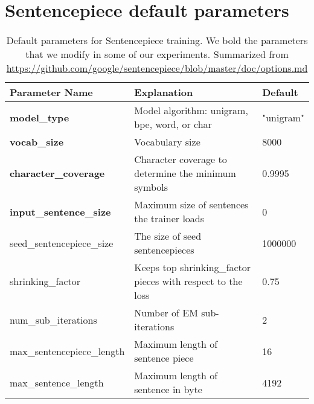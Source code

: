 \chapter{Sentencepiece default parameters}


\begin{table}[h]
    \centering
    \begin{tabular}{|p{5.3cm}|p{5cm}|p{2cm}|}
    \hline
    \textbf{Parameter Name} & \textbf{Explanation} & \textbf{Default} \\
    \hline
    \textbf{model\_type} & Model algorithm: unigram, bpe, word, or char & "unigram" \\
    \hline
    \textbf{vocab\_size} & Vocabulary size & 8000 \\
    \hline
    \textbf{character\_coverage} & Character coverage to determine the minimum symbols & 0.9995 \\
    \hline
    \textbf{input\_sentence\_size} & Maximum size of sentences the trainer loads & 0 \\
    \hline
    seed\_sentencepiece\_size & The size of seed sentencepieces & 1000000 \\
    \hline
    shrinking\_factor & Keeps top shrinking\_factor pieces with respect to the loss & 0.75 \\
    \hline
    num\_sub\_iterations & Number of EM sub-iterations & 2 \\
    \hline
    max\_sentencepiece\_length & Maximum length of sentence piece & 16 \\
    \hline
    max\_sentence\_length & Maximum length of sentence in byte & 4192 \\
    \hline
    \end{tabular}
    \caption{Default parameters for Sentencepiece training. We bold the parameters that we modify in some of our experiments. Summarized from \url{https://github.com/google/sentencepiece/blob/master/doc/options.md}}
    \label{tab:sentencepiece_defaults}
\end{table}
    

